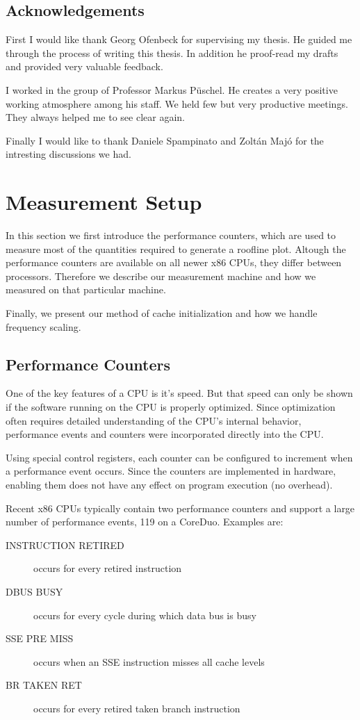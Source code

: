 \documentclass[a4paper,12pt]{article}
\begin{document}
\subsection{Acknowledgements}
First I would like thank Georg Ofenbeck for supervising my thesis. He guided me
through the process of writing this thesis. In addition he proof-read my drafts
and provided very valuable feedback.

I worked in the group of Professor Markus P\"uschel. He creates a very
positive working atmosphere among his staff. We held few but very productive
meetings. They always helped me to see clear again.

Finally I would like to thank Daniele Spampinato and Zolt\'an Maj\'o for the
intresting discussions we had.

\section{Measurement Setup}
In this section we first introduce the performance counters, which are
used to measure most of the quantities required to generate a roofline
plot. Altough the performance counters are available on all newer x86 CPUs,
they differ between processors. Therefore we describe our measurement
machine and how we measured on that particular machine.

Finally, we present our method of cache initialization and how we handle
frequency scaling.
 
\subsection{Performance Counters}
One of the key features of a CPU is it's speed. But that speed can only be
shown if the software running on the CPU is properly optimized. Since
optimization often requires detailed understanding of the CPU's internal
behavior, performance events and counters were incorporated directly into the
CPU. 

Using special control registers, each counter can be configured to increment
when a performance event occurs. Since the counters are implemented in hardware,
enabling them does not have any effect on program execution (no overhead). 

Recent x86 CPUs typically contain two performance counters and support a large
number of performance events, 119 on a CoreDuo. Examples are:
\begin{description}
  \item[INSTRUCTION RETIRED] occurs for every retired instruction
  \item[DBUS BUSY] occurs for every cycle during which data bus is busy
  \item[SSE PRE MISS] occurs when an SSE instruction misses all cache levels
  \item[BR TAKEN RET] occurs for every retired taken branch instruction 
\end{description}
\end{document}
